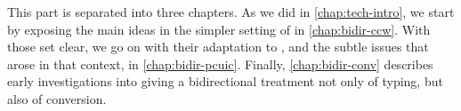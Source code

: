  

This part is separated into three chapters.
As we did in \cref{chap:tech-intro}, we start by exposing the main ideas in the
simpler setting of  in \cref{chap:bidir-ccw}.
With those set clear, we go on with their adaptation to , and the subtle
issues that arose in that context, in \cref{chap:bidir-pcuic}.
Finally, \cref{chap:bidir-conv} describes early investigations into giving a
bidirectional treatment not only of typing, but also of conversion.

